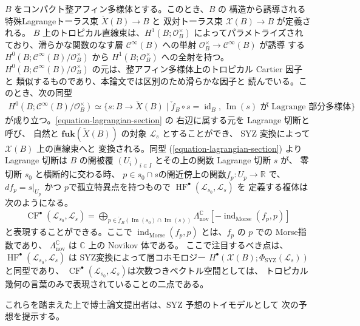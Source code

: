 \documentclass[a4paper,dvipdfmx,reqno,12pt]{amsart}
\theoremstyle{definition}
\newcommand{\opn}[1]{\operatorname{#1}}
\newcommand{\catn}[1]{\mathbf{#1}}
\numberwithin{equation}{section}
\begin{document}
$B$ をコンパクト整アフィン多様体とする。このとき、$B$ の
構造から誘導される特殊Lagrangeトーラス束 
$\check{X}(B)\to B$ と 
双対トーラス束 $\mathcal{X}(B)\to B$ が定義される。
$B$ 上のトロピカル直線束は、$H^{1}(B;\mathcal{O}^{\times}_B)$
によってパラメトライズされており、滑らかな関数のなす層 
$\mathcal{C}^{\infty}(B)$ への単射 
$\mathcal{O}_{B}^{\times}\to \mathcal{C}^{\infty}(B)$ が誘導
する $H^{0}(B;\mathcal{C}^{\infty}(B)/\mathcal{O}_{B}^{\times})$
から $H^{1}(B;\mathcal{O}^{\times}_B)$ への全射を持つ。
$H^{0}(B;\mathcal{C}^{\infty}(B)/\mathcal{O}_{B}^{\times})$
の元は、整アフィン多様体上のトロピカル Cartier 因子と
類似するものであり、本論文では区別のため滑らかな因子と
読んでいる。このとき、次の同型
\begin{align} \label{equation-lagrangian-section}
H^{0}(B;\mathcal{C}^{\infty}(B)/\mathcal{O}_{B}^{\times})
\simeq \{s\colon B\to \check{X}(B)\mid 
\check{f}_{B}\circ s=\opn{id}_B, \,
\opn{Im}(s) \text{ が Lagrange 部分多様体} \}
\end{align}
が成り立つ。\ref{equation-lagrangian-section} の
右辺に属する元を Lagrange 切断と呼び、
自然と $\catn{fuk}(\check{X}(B))$ の対象
$\mathscr{L}_s$ とすることができ、
SYZ 変換によって$\mathcal{X}(B)$ 上の直線束へと
変換される。同型 (\ref{equation-lagrangian-section})
より Lagrange 切断は $B$ の開被覆 $(U_i)_{i\in I}$ 
とその上の関数
Lagrange 切断 $s$ が、
零切断 $s_0$ と横断的に交わる時、
$p\in s_0\cap s$の開近傍上の関数$f_p\colon U_p\to \mathbb{R}$
で、$df_p=s|_{U_p}$ かつ $p$で孤立特異点を持つもので 
$\opn{HF}^{\bullet}(\mathscr{L}_{s_0},\mathscr{L}_s)$ を
定義する複体は次のようになる。
\begin{align}
\opn{CF}^{\bullet}(\mathscr{L}_{s_0},
\mathscr{L}_s)=\bigoplus_{p\in \check{f}_{B}(\opn{Im}(s_0)\cap \opn{Im}(s))}
\Lambda^{\mathbb{C}}_{\mathrm{nov}}[-\opn{ind}_{\mathrm{Morse}}(f_p,p)]
\end{align}
と表現することができる\cite{MR1882331}。ここで
$\opn{ind}_{\mathrm{Morse}}(f_p,p)$
とは、$f_p$ の $p$ での Morse指数であり、
$\Lambda^{\mathbb{C}}_{\mathrm{nov}}$ は
$\mathbb{C}$ 上の Novikov 体である。
ここで注目するべき点は、
$\opn{HF}^{\bullet}(\mathscr{L}_{s_0},\mathscr{L}_{s})$
は SYZ変換によって層コホモロジー
$H^{\bullet}(\mathcal{X}(B);
\Phi_{\opn{SYZ}}(\mathscr{L}_{s}))$
と同型であり\cite{MR4301560}、
$\opn{CF}^{\bullet}(\mathscr{L}_{s_0},
\mathscr{L}_s)$は次数つきベクトル空間としては、
トロピカル幾何の言葉のみで表現されていることの二点である。

これらを踏まえた上で博士論文提出者は、SYZ 予想のトイモデルとして
次の予想を提示する。
\end{document}
